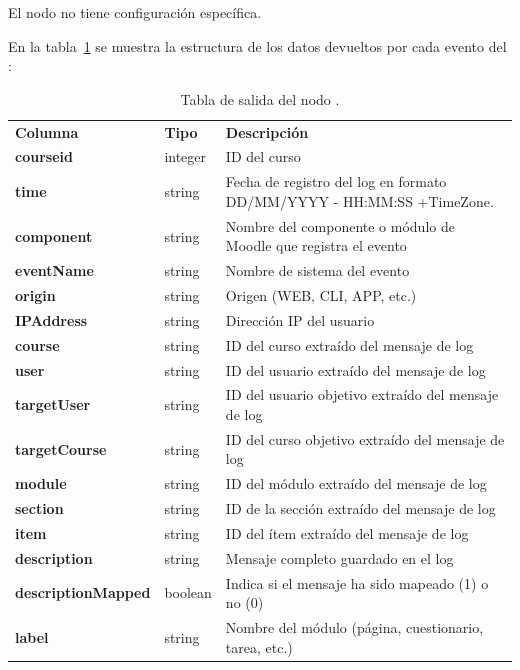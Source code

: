 El nodo no tiene configuración específica. 
\

En la tabla~\ref{tab:moodle_reports_logs_desc} se muestra la estructura de los datos devueltos por cada evento del : 

\begin{table}[!h]
	\begin{center}
		\begin{tabular}{p{}p{}p{}}
			\toprule
			\textbf{Columna} & \textbf{Tipo} & \textbf{Descripción}\\
			\otoprule
			\textbf{courseid} & integer & ID del curso \\
         \hline
			\textbf{time} & string & Fecha de registro del log en formato DD/MM/YYYY - HH:MM:SS +TimeZone. \\
         \hline
         \textbf{component} & string & Nombre del componente o módulo de Moodle que registra el evento \\
         \hline
         \textbf{eventName} & string & Nombre de sistema del evento \\
         \hline
         \textbf{origin} & string & Origen (WEB, CLI, APP, etc.) \\
         \hline
         \textbf{IPAddress} & string & Dirección IP del usuario \\
         \hline
         \textbf{course} & string & ID del curso extraído del mensaje de log \\
         \hline
         \textbf{user} & string & ID del usuario extraído del mensaje de log \\
         \hline
         \textbf{targetUser} & string & ID del usuario objetivo extraído del mensaje de log \\
         \hline
         \textbf{targetCourse} & string &  ID del curso objetivo extraído del mensaje de log \\
         \hline
         \textbf{module} & string &  ID del módulo extraído del mensaje de log \\
         \hline
         \textbf{section} & string &  ID de la sección extraído del mensaje de log \\
         \hline
         \textbf{item} & string &  ID del ítem extraído del mensaje de log \\
         \hline
         \textbf{description} & string & Mensaje completo guardado en el log \\
         \hline
         \textbf{descriptionMapped} & boolean &  Indica si el mensaje ha sido mapeado (1) o no (0)\\
         \hline
         \textbf{label} & string & Nombre del módulo (página, cuestionario, tarea, etc.) \\
         \bottomrule
		\end{tabular}
	\end{center}
	\caption{Tabla de salida del nodo .}
	\label{tab:moodle_reports_logs_desc}
\end{table}
\FloatBarrier

